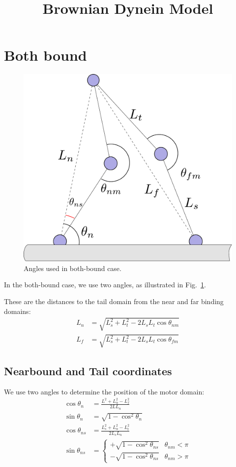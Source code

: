 \documentclass[11pt,twocolumn]{article}
\title{Brownian Dynein Model}
\begin{document}
\maketitle

\section{Both bound}

\begin{figure}
  \includegraphics[width=\columnwidth]{../figures/code-bothbound}
  \caption{Angles used in both-bound case.}\label{fig:bothbound}
\end{figure}

In the both-bound case, we use two angles, as illustrated in
Fig.~\ref{fig:bothbound}.

These are the distances to the tail domain from the near and far
binding domains:
\begin{align}
  L_n &= \sqrt{L_s^2 + L_t^2 - 2L_sL_t\cos{\theta_{nm}}} \\
  L_f &= \sqrt{L_s^2 + L_t^2 - 2L_sL_t\cos{\theta_{fm}}}
\end{align}

\subsection{Nearbound and Tail coordinates}

We use two angles to determine the position of the motor domain:
\begin{align}
  \cos\theta_n &= \frac{L^2 + L_n^2 - L_f^2}{2L L_n} \\
  \sin\theta_{n} &= \sqrt{1 - \cos^2\theta_{n}} \\
  \cos\theta_{ns} &= \frac{L_s^2 + L_n^2 - L_t^2}{2L_s L_n} \\
  \sin\theta_{ns} &=
  \begin{cases}
    +\sqrt{1 - \cos^2\theta_{ns}} & \theta_{nm} < \pi \\
    -\sqrt{1 - \cos^2\theta_{ns}} & \theta_{nm} > \pi
  \end{cases}
\end{align}
\end{document}
